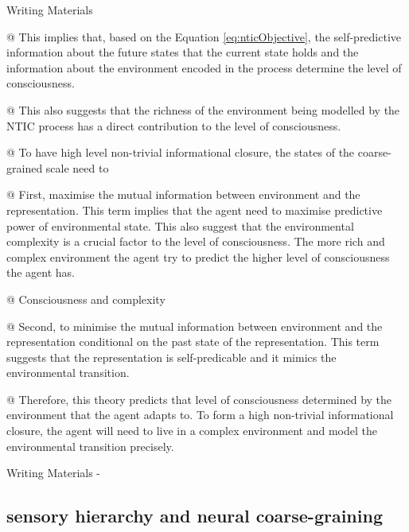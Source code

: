 \documentclass[utf8]{article}
\newenvironment{WritingMaterials} %
    	{
            \begin{tcolorbox}[enhanced,
                title=-,
                size=small,
                colbacktitle=Aquamarine,
                drop fuzzy shadow,
                fontupper=\small,
                boxrule=0.4pt,
                colback=Aquamarine!10!white,
                sharp corners]
                Writing Materials
            \end{tcolorbox}
            \begin{easylist}[itemize]
    	}
    	{
            \end{easylist}  
            \begin{tcolorbox}[enhanced,
                halign=flush right,
                halign title=right,
                size=small,
                colbacktitle=Aquamarine,
                drop fuzzy shadow,
                fontupper=\small,
                boxrule=0.4pt,
                colback=Aquamarine,
                colupper=White,
                sharp corners]
                Writing Materials -
            \end{tcolorbox}        
    	}
\newcommand{\rlstart}[1]{  %
        \setlength\changebarwidth{#1pt*2}  %
        \hspace*{-40pt}
        \cbstart{\textcolor{red}{\newline\textbf{iteration #1}}\newline}}
\newcommand{\rlend}{\cbend}
\begin{document}
			\begin{WritingMaterials}
    			@ This implies that, based on the Equation \ref{eq:nticObjective}, the self-predictive information about the future states that the current state holds and the information about the environment encoded in the process determine the level of consciousness.
    			
    			@ This also suggests that the richness of the environment being modelled by the	NTIC process has a direct contribution to the level of consciousness.
    			

				@ To have high level non-trivial informational closure, the states of the coarse-grained scale need to

				@ First, maximise the mutual information between environment and the representation.
				This term implies that the agent need to maximise predictive power of environmental state. This also suggest that the environmental complexity is a crucial factor to the level of consciousness. The more rich and complex environment the agent try to predict the higher level of consciousness the agent has.
				
				@ Consciousness and complexity \cite{Tononi1998}


				@ Second, to minimise the mutual information between environment and the representation conditional on the past state of the representation. This term suggests that the representation is self-predicable and it mimics the environmental transition.

				@ Therefore, this theory predicts that level of consciousness determined by the environment that the agent adapts to. To form a high non-trivial informational closure, the agent will need to live in a complex environment and model the environmental transition precisely.


			\end{WritingMaterials}


\rlend    


\rlstart{2}
		\subsection{sensory hierarchy and neural coarse-graining}\label{sec:SensoryHierarchy}
\end{document}
